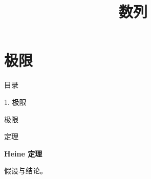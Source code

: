 \documentclass[aspectratio=169,10pt,fontset=fandol]{ctexbeamer}
\title{数列}
\begin{document}
\section{极限}
\begin{frame}[t,fragile]{目录}
\normalsize
{\color{blue}\normalsize 1. 极限\par}\vspace{0.3em}
\end{frame}
\begin{frame}[t,fragile]{极限}
\normalsize
\begin{block}{定理}
{\normalsize
\textbf{Heine 定理}\par
假设与结论。
}
\end{block}
\end{frame}
\end{document}

